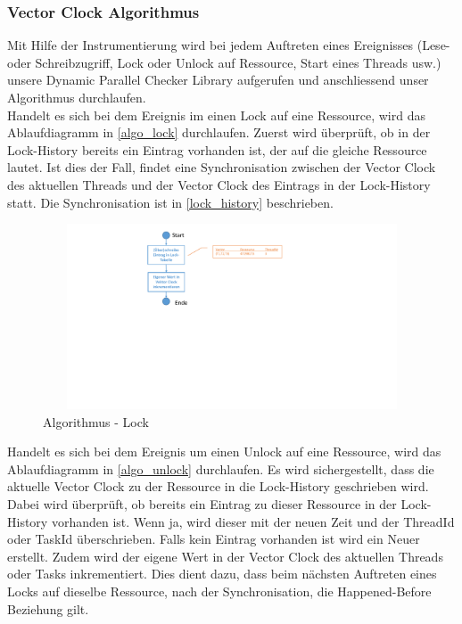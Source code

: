 \documentclass[10pt,a4paper]{article}
\begin{document}
\subsubsection{Vector Clock Algorithmus}\label{vector_algorithm}
\begin{flushleft}
Mit Hilfe der Instrumentierung wird bei jedem Auftreten eines Ereignisses (Lese- oder Schreibzugriff, Lock oder Unlock auf Ressource, Start eines Threads usw.) unsere Dynamic Parallel Checker Library aufgerufen und anschliessend unser Algorithmus durchlaufen.\\[0.3cm]
Handelt es sich bei dem Ereignis im einen Lock auf eine Ressource, wird das Ablaufdiagramm in \autoref{algo_lock} durchlaufen. Zuerst wird überprüft, ob in der Lock-History bereits ein Eintrag vorhanden ist, der auf die gleiche Ressource lautet. Ist dies der Fall, findet eine Synchronisation zwischen der Vector Clock des aktuellen Threads und der Vector Clock des Eintrags in der Lock-History statt. Die Synchronisation ist in \ref{lock_history} beschrieben.\\
\begin{figure}[H]
	\includegraphics[width=13cm,height=5.5cm,trim=70mm 106mm 80mm 8mm, clip]{images/Lock.pdf}
\caption{Algorithmus - Lock}\label{algo_lock}
\end{figure}
Handelt es sich bei dem Ereignis um einen Unlock auf eine Ressource, wird das Ablaufdiagramm in \autoref{algo_unlock} durchlaufen. Es wird sichergestellt, dass die aktuelle Vector Clock zu der Ressource in die Lock-History geschrieben wird. Dabei wird überprüft, ob bereits ein Eintrag zu dieser Ressource in der Lock-History vorhanden ist. Wenn ja, wird dieser mit der neuen Zeit und der ThreadId oder TaskId überschrieben. Falls kein Eintrag vorhanden ist wird ein Neuer erstellt. Zudem wird der eigene Wert in der Vector Clock des aktuellen Threads oder Tasks inkrementiert. Dies dient dazu, dass beim nächsten Auftreten eines Locks auf dieselbe Ressource, nach der Synchronisation, die Happened-Before Beziehung gilt. \\

\end{flushleft}
\end{document}
